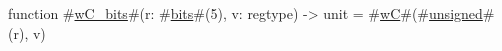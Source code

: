 function #\hyperref[sailRISCVzwCzybits]{wC\_bits}#(r: #\hyperref[sailRISCVzbits]{bits}#(5), v: regtype) -> unit = #\hyperref[sailRISCVzwC]{wC}#(#\hyperref[sailRISCVzunsigned]{unsigned}#(r), v)
